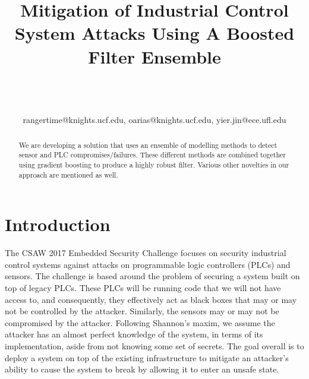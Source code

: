 \documentclass[10pt,twocolumn]{IEEEtran}
\begin{document}
\title{Mitigation of Industrial Control System Attacks Using A Boosted Filter Ensemble}

\author{\\
\\
\\
{rangertime@knights.ucf.edu, oarias@knights.ucf.edu, yier.jin@ece.ufl.edu}\vspace{-0.16in}\vspace{-0.2in}}

\maketitle
\pagestyle{empty}
\thispagestyle{empty}

\begin{abstract}
We are developing a solution that uses an ensemble of modelling methods to detect sensor and PLC compromises/failures.
These different methods are combined together using gradient boosting to produce a highly robust filter.
Various other novelties in our approach are mentioned as well.
\end{abstract}

\section{Introduction}
The CSAW 2017 Embedded Security Challenge focuses on security industrial control systems against attacks on programmable logic controllers (PLCs) and sensors.
The challenge is based around the problem of securing a system built on top of legacy PLCs.
These PLCs will be running code that we will not have access to, and consequently, they effectively act as black boxes that may or may not be controlled by the attacker.
Similarly, the sensors may or may not be compromised by the attacker.
Following Shannon's maxim, we assume the attacker has an almost perfect knowledge of the system, in terms of its implementation, aside from not knowing some set of secrets.
The goal overall is to deploy a system on top of the existing infrastructure to mitigate an attacker's ability to cause the system to break by allowing it to enter an unsafe state.
\end{document}
